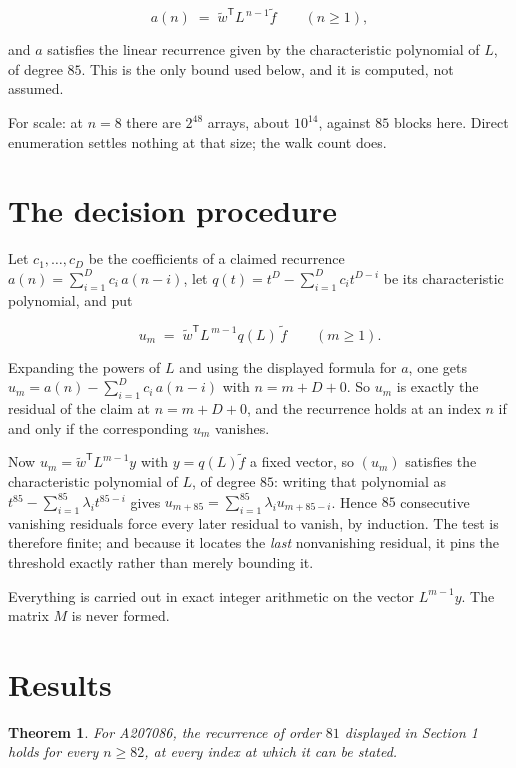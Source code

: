 \documentclass[11pt]{article}
\newtheorem{theorem}{Theorem}
\theoremstyle{definition}
\begin{document}
\[a(n) \;=\; \tilde w^{\mathsf T} L^{\,n-1} \tilde f \qquad (n \ge 1),\]

and $a$ satisfies the linear recurrence given by the characteristic polynomial of $L$, of degree $85$. This is the only bound used below, and it is computed, not assumed.

For scale: at $n = 8$ there are $2^{48}$ arrays, about $10^{14}$, against $85$ blocks here. Direct enumeration settles nothing at that size; the walk count does.

\section{The decision procedure}

Let $c_1,\dots,c_D$ be the coefficients of a claimed recurrence $a(n) = \sum_{i=1}^{D} c_i\,a(n-i)$, let $q(t) = t^{D} - \sum_{i=1}^{D} c_i t^{D-i}$ be its characteristic polynomial, and put

\[u_m \;=\; \tilde w^{\mathsf T} L^{\,m-1} q(L)\,\tilde f \qquad (m \ge 1).\]

Expanding the powers of $L$ and using the displayed formula for $a$, one gets $u_m = a(n) - \sum_{i=1}^{D} c_i\,a(n-i)$ with $n = m + D + 0$. So $u_m$ is exactly the residual of the claim at $n = m + D + 0$, and the recurrence holds at an index $n$ if and only if the corresponding $u_m$ vanishes.

Now $u_m = \tilde w^{\mathsf T} L^{m-1} y$ with $y = q(L)\tilde f$ a fixed vector, so $(u_m)$ satisfies the characteristic polynomial of $L$, of degree $85$: writing that polynomial as $t^{85} - \sum_{i=1}^{85} \lambda_i t^{85-i}$ gives $u_{m+85} = \sum_{i=1}^{85} \lambda_i u_{m+85-i}$. Hence $85$ consecutive vanishing residuals force every later residual to vanish, by induction. The test is therefore finite; and because it locates the {\itshape last} nonvanishing residual, it pins the threshold exactly rather than merely bounding it.

Everything is carried out in exact integer arithmetic on the vector $L^{m-1}y$. The matrix $M$ is never formed.

\section{Results}

\begin{theorem} For A207086, the recurrence of order $81$ displayed in Section 1 holds for every $n \ge 82$, at every index at which it can be stated.\end{theorem}
\end{document}
